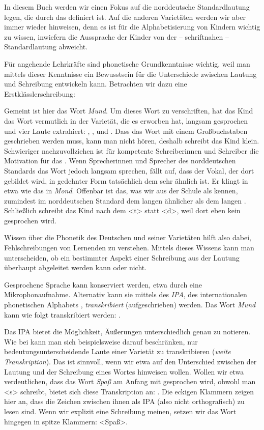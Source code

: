 In diesem Buch werden wir einen Fokus auf die norddeutsche Standardlautung legen, die durch das \citet{DudenAussprache2023} definiert ist. Auf die anderen Varietäten werden wir aber immer wieder hinweisen, denn es ist für die Alphabetisierung von Kindern wichtig zu wissen, inwiefern die Aussprache der Kinder von der -- schriftnahen -- Standardlautung abweicht.

Für angehende Lehrkräfte sind phonetische Grundkenntnisse wichtig, weil man mittels dieser Kenntnisse ein Bewusstsein für die Unterschiede zwischen Lautung und Schreibung entwickeln kann. Betrachten wir dazu eine Erstklässlerschreibung:

\label{ea:mont} 
\z

Gemeint ist hier das Wort \textit{Mund}. Um dieses Wort zu verschriften, hat das Kind das Wort vermutlich in der Varietät, die es erworben hat, langsam gesprochen und vier Laute extrahiert: \textipa{[m]}, \textipa{[o]}, \textipa{[n]} und \textipa{[t]}. Dass das Wort mit einem Großbuchstaben geschrieben werden muss, kann man nicht hören, deshalb schreibt das Kind klein. Schwieriger nachzuvollziehen ist für kompetente Schreiberinnen und Schreiber die Motivation für das \textipa{[o]}. Wenn Sprecherinnen und Sprecher des norddeutschen Standards das Wort jedoch langsam sprechen, fällt auf, dass der Vokal, der dort gebildet wird, in gedehnter Form tatsächlich dem \textipa{[o]} sehr ähnlich ist. Er klingt in etwa wie das \textipa{[o]} in \textit{Mond}. Offenbar ist das, was wir aus der Schule als  kennen, zumindest im norddeutschen Standard dem langen \textipa{[o]} ähnlicher als dem langen \textipa{[u]}. Schließlich schreibt das Kind nach dem \textipa{[n]} <t> statt <d>, weil dort eben kein \textipa{[d]} gesprochen wird. 

Wissen über die Phonetik des Deutschen und seiner Varietäten hilft also dabei, Fehlschreibungen von Lernenden zu verstehen. Mittels dieses Wissens kann man unterscheiden, ob ein bestimmter Aspekt einer Schreibung aus der Lautung überhaupt abgeleitet werden kann oder nicht.

Gesprochene Sprache kann konserviert werden, etwa durch eine Mikrophonaufnahme. Alternativ kann sie mittels des \textit{IPA}, des internationalen phonetischen Alphabets \citep{IPA1999}, \textit{transkribiert} (aufgeschrieben) werden. Das Wort \textit{Mund} kann wie folgt transkribiert werden: \textipa{[mUnt]}. 

Das IPA bietet die Möglichkeit, Äußerungen unterschiedlich genau zu notieren. Wie bei \textipa{[mUnt]} kann man sich beispielsweise darauf beschränken, nur bedeutungsunterscheidende Laute einer Varietät zu transkribieren (\textit{weite Transkription}).
 Das ist sinnvoll, wenn wir etwa auf den Unterschied zwischen der Lautung und der Schreibung eines Wortes hinweisen wollen. Wollen wir etwa verdeutlichen, dass das Wort \textit{Spaß} am Anfang mit \textipa{[S]} gesprochen wird, obwohl man <s> schreibt, bietet sich diese Transkription an: \textipa{[Spa:s]}. Die eckigen Klammern zeigen hier an, dass die Zeichen zwischen ihnen als IPA (also nicht orthografisch) zu lesen sind. Wenn wir explizit eine Schreibung meinen, setzen wir das Wort hingegen in spitze Klammern: <Spaß>.

